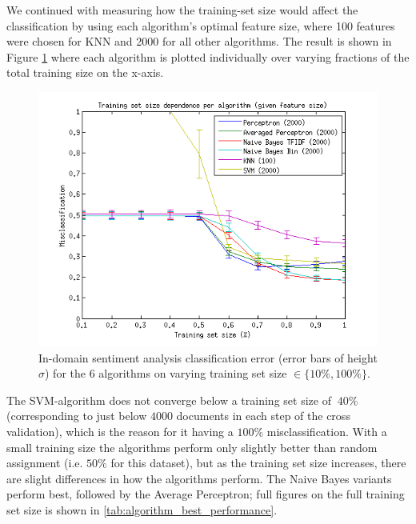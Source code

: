 We continued with measuring how the training-set size would affect the classification by using each algorithm's optimal feature size, where 100 features were chosen for KNN and 2000 for all other algorithms. The result is shown in Figure \ref{fig:trainingsize} where each algorithm is plotted individually over varying fractions of the total training size on the x-axis.
\begin{figure}[h!]
\centering
\includegraphics[width=1\linewidth]{../Plottar/training_size_k_2000allknn_100.png}
\caption{In-domain sentiment analysis classification error (error bars of height $\sigma$) for the 6 algorithms on varying training set size $\in \{10\%, 100\%\}$.}
\label{fig:trainingsize}
\end{figure}

The SVM-algorithm does not converge below a training set size of $~40\%$ (corresponding to just below $4 000$ documents in each step of the cross validation), which is the reason for it having a $100\%$ misclassification. With a small training size the algorithms perform only slightly better than random assignment (i.e. $50\%$ for this dataset), but as the training set size increases, there are slight differences in how the algorithms perform. The Naive Bayes variants perform best, followed by the Average Perceptron; full figures on the full training set size is shown in \ref{tab:algorithm_best_performance}.

